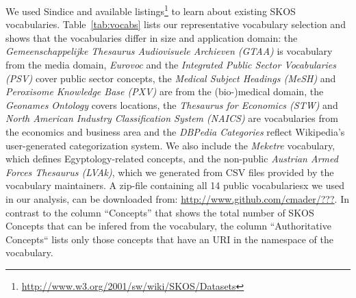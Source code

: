 We used Sindice and available listings\footnote{\url{http://www.w3.org/2001/sw/wiki/SKOS/Datasets}} to learn about existing SKOS vocabularies. Table~\ref{tab:vocabs} lists our representative vocabulary selection and shows that the vocabularies differ in size and application domain: the \emph{Gemeenschappelijke Thesaurus Audiovisuele Archieven (GTAA)} is vocabulary from the media domain, \emph{Eurovoc} and the \emph{Integrated Public Sector Vocabularies (PSV)} cover public sector concepts, the \emph{Medical Subject Headings (MeSH)} and \emph{Peroxisome Knowledge Base (PXV)} are from the (bio-)medical domain, the \emph{Geonames Ontology} covers locations, the \emph{Thesaurus for Economics (STW)} and \emph{North American Industry Classification System (NAICS)} are vocabularies from the economics and business area and the \emph{DBPedia Categories} reflect Wikipedia's user-generated categorization system. We also include the \emph{Meketre} vocabulary, which defines Egyptology-related concepts, and the non-public \emph{Austrian Armed Forces Thesaurus (LVAk)}, which we generated from CSV files provided by the vocabulary maintainers. A zip-file containing all 14 public vocabulariesx we used in our analysis, can be downloaded from: \url{http://www.github.com/cmader/???}. In contrast to the column ``Concepts'' that shows the total number of SKOS Concepts that can be infered from the vocabulary, the column ``Authoritative Concepts`` lists only those concepts that have an URI in the namespace of the vocabulary. 

